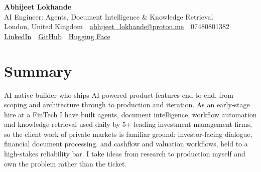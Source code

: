 \documentclass[10pt,a4paper]{article}
\newcommand{\sep}{\,\textcolor{accent!60}{\textbar}\,}
\begin{document}
\begin{center}
  {\fontsize{24}{26}\selectfont\bfseries Abhijeet Lokhande}\\[3pt]
  {\color{accent}\large AI Engineer: Agents, Document Intelligence \& Knowledge Retrieval}\\[5pt]
  {\small
    London, United Kingdom \sep
    \href{mailto:abhijeet_lokhande@proton.me}{abhijeet\_lokhande@proton.me} \sep
    07480801382 \\[2pt]
    \href{https://www.linkedin.com/in/ablds/}{LinkedIn} \sep
    \href{https://github.com/abhijeetscode}{GitHub} \sep
    \href{https://huggingface.co/ab-ai}{Hugging Face}
  }
\end{center}
\vspace{2pt}

\section{Summary}
AI-native builder who ships AI-powered product features end to end, from scoping and architecture through to production and iteration. As an early-stage hire at a FinTech I have built agents, document intelligence, workflow automation and knowledge retrieval used daily by 5+ leading investment management firms, so the client work of private markets is familiar ground: investor-facing dialogue, financial document processing, and cashflow and valuation workflows, held to a high-stakes reliability bar. I take ideas from research to production myself and own the problem rather than the ticket.

\end{document}
